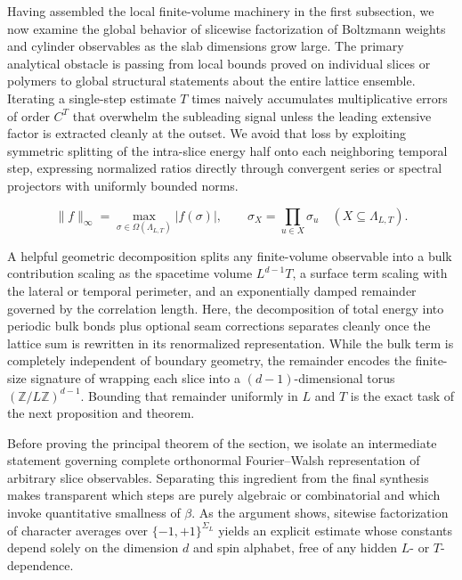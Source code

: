 \documentclass[11pt]{article}
\theoremstyle{definition}
\begin{document}
Having assembled the local finite-volume machinery in the first subsection, we now
examine the global behavior of slicewise factorization of Boltzmann weights and
cylinder observables as the slab dimensions grow large. The primary analytical
obstacle is passing from local bounds proved on individual slices or polymers to
global structural statements about the entire lattice ensemble. Iterating a
single-step estimate $T$ times naively accumulates multiplicative errors of order
$C^T$ that overwhelm the subleading signal unless the leading extensive factor is
extracted cleanly at the outset. We avoid that loss by exploiting symmetric
splitting of the intra-slice energy half onto each neighboring temporal step,
expressing normalized ratios directly through convergent series or spectral
projectors with uniformly bounded norms.

\[
  \|f\|_\infty = \max_{\sigma \in \Omega(\Lambda_{L,T})} |f(\sigma)|, \qquad \sigma_X = \prod_{u \in X} \sigma_u \quad (X \subseteq \Lambda_{L,T}).
\]

A helpful geometric decomposition splits any finite-volume observable into a bulk
contribution scaling as the spacetime volume $L^{d-1} T$, a surface term scaling
with the lateral or temporal perimeter, and an exponentially damped remainder
governed by the correlation length. Here, the decomposition of total energy into
periodic bulk bonds plus optional seam corrections separates cleanly once the
lattice sum is rewritten in its renormalized representation. While the bulk term is
completely independent of boundary geometry, the remainder encodes the finite-size
signature of wrapping each slice into a $(d-1)$-dimensional torus
$(\mathbb{Z}/L\mathbb{Z})^{d-1}$. Bounding that remainder uniformly in $L$ and $T$
is the exact task of the next proposition and theorem.

Before proving the principal theorem of the section, we isolate an intermediate
statement governing complete orthonormal Fourier--Walsh representation of arbitrary
slice observables. Separating this ingredient from the final synthesis makes
transparent which steps are purely algebraic or combinatorial and which invoke
quantitative smallness of $\beta$. As the argument shows, sitewise factorization of
character averages over $\{-1, +1\}^{\Sigma_L}$ yields an explicit estimate whose
constants depend solely on the dimension $d$ and spin alphabet, free of any hidden
$L$- or $T$-dependence.
\end{document}
